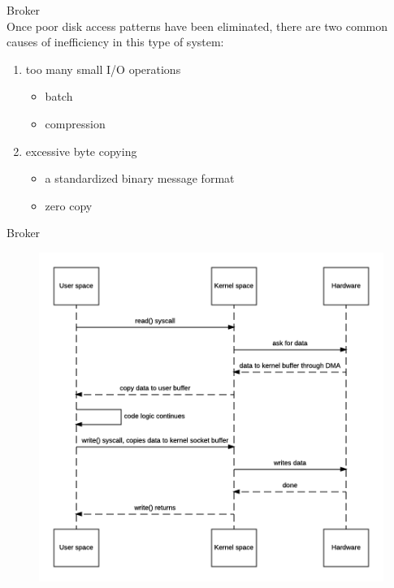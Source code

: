 \begin{frame}[plain,t]{Broker} %
     \\
    \vspace{2ex}
Once poor disk access patterns have been eliminated, there are two common causes of inefficiency in this type of system:
\vspace{2ex}
\begin{enumerate}
    \item too many small I/O operations
    \begin{itemize}
        \item batch
        \item compression
    \end{itemize}
    \item excessive byte copying
    \begin{itemize}
        \item a standardized binary message format
        \item zero copy
    \end{itemize}
\end{enumerate}


\end{frame}
\begin{frame}[plain,t]{Broker} %
     \\
 \begin{figure}
    \centering
    \includegraphics[width=0.7\linewidth]{image/0201}
    \label{fig:0201}
\end{figure}
\end{frame}

